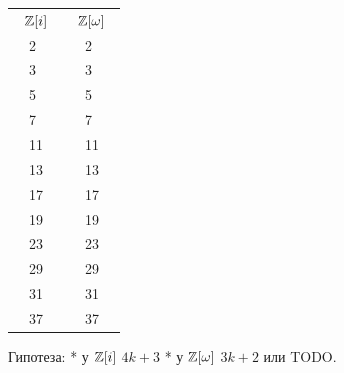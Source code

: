 \begin{solution}
\begin{table}[H]
\centering
\begin{tabular}{llllll}
\multicolumn{3}{c}{$\mathbb{Z}[i]$} & \multicolumn{3}{c}{$\mathbb{Z}[\omega]$} \\
        & 2      & \x     & \y       & 2        &          \\
\y      & 3      &        &          & 3        & \x       \\
        & 5      & \x     & \y       & 5        &          \\
\y      & 7      &        &          & 7        & \x       \\
\y      & 11     &        & \y       & 11       &          \\
        & 13     & \x     &          & 13       & \x       \\
        & 17     & \x     & \y       & 17       &          \\
\y      & 19     &        &          & 19       & \x       \\
\y      & 23     &        & \y       & 23       &          \\
        & 29     & \x     & \y       & 29       &          \\
\y      & 31     &        &          & 31       & \x       \\
        & 37     & \x     &          & 37       & \x        
\end{tabular}
\end{table}

Гипотеза:
* у \(\mathbb{Z}[i]\) \(4k+3\)
* у \(\mathbb{Z}[\omega]\) \(3k+2\) или TODO.
\end{solution}

\begin{problem}[14 (3.9)]
\end{problem}

